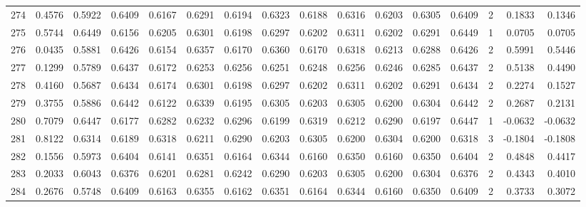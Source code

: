 \begin{tabular}{lrrrrrrrrrrrrrrr}
274 &      0.4576 &  0.5922 &  0.6409 &  0.6167 &  0.6291 &  0.6194 &  0.6323 &  0.6188 &  0.6316 &  0.6203 &   0.6305 &     0.6409 &      2 &                    0.1833 &                     0.1346 \\
275 &      0.5744 &  0.6449 &  0.6156 &  0.6205 &  0.6301 &  0.6198 &  0.6297 &  0.6202 &  0.6311 &  0.6202 &   0.6291 &     0.6449 &      1 &                    0.0705 &                     0.0705 \\
276 &      0.0435 &  0.5881 &  0.6426 &  0.6154 &  0.6357 &  0.6170 &  0.6360 &  0.6170 &  0.6318 &  0.6213 &   0.6288 &     0.6426 &      2 &                    0.5991 &                     0.5446 \\
277 &      0.1299 &  0.5789 &  0.6437 &  0.6172 &  0.6253 &  0.6256 &  0.6251 &  0.6248 &  0.6256 &  0.6246 &   0.6285 &     0.6437 &      2 &                    0.5138 &                     0.4490 \\
278 &      0.4160 &  0.5687 &  0.6434 &  0.6174 &  0.6301 &  0.6198 &  0.6297 &  0.6202 &  0.6311 &  0.6202 &   0.6291 &     0.6434 &      2 &                    0.2274 &                     0.1527 \\
279 &      0.3755 &  0.5886 &  0.6442 &  0.6122 &  0.6339 &  0.6195 &  0.6305 &  0.6203 &  0.6305 &  0.6200 &   0.6304 &     0.6442 &      2 &                    0.2687 &                     0.2131 \\
280 &      0.7079 &  0.6447 &  0.6177 &  0.6282 &  0.6232 &  0.6296 &  0.6199 &  0.6319 &  0.6212 &  0.6290 &   0.6197 &     0.6447 &      1 &                   -0.0632 &                    -0.0632 \\
281 &      0.8122 &  0.6314 &  0.6189 &  0.6318 &  0.6211 &  0.6290 &  0.6203 &  0.6305 &  0.6200 &  0.6304 &   0.6200 &     0.6318 &      3 &                   -0.1804 &                    -0.1808 \\
282 &      0.1556 &  0.5973 &  0.6404 &  0.6141 &  0.6351 &  0.6164 &  0.6344 &  0.6160 &  0.6350 &  0.6160 &   0.6350 &     0.6404 &      2 &                    0.4848 &                     0.4417 \\
283 &      0.2033 &  0.6043 &  0.6376 &  0.6201 &  0.6281 &  0.6242 &  0.6290 &  0.6203 &  0.6305 &  0.6200 &   0.6304 &     0.6376 &      2 &                    0.4343 &                     0.4010 \\
284 &      0.2676 &  0.5748 &  0.6409 &  0.6163 &  0.6355 &  0.6162 &  0.6351 &  0.6164 &  0.6344 &  0.6160 &   0.6350 &     0.6409 &      2 &                    0.3733 &                     0.3072 \\

\end{tabular}
